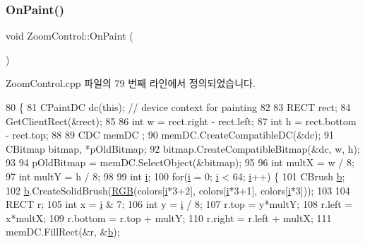 \subsubsection{\texorpdfstring{On\+Paint()}{OnPaint()}}
{\footnotesize\ttfamily void Zoom\+Control\+::\+On\+Paint (\begin{DoxyParamCaption}{ }\end{DoxyParamCaption})\hspace{0.3cm}{\ttfamily [protected]}}



Zoom\+Control.\+cpp 파일의 79 번째 라인에서 정의되었습니다.


\begin{DoxyCode}
80 \{
81   CPaintDC dc(\textcolor{keyword}{this}); \textcolor{comment}{// device context for painting}
82   
83   RECT rect;
84   GetClientRect(&rect);
85 
86   \textcolor{keywordtype}{int} w = rect.right - rect.left;
87   \textcolor{keywordtype}{int} h = rect.bottom - rect.top;
88   
89   CDC memDC ;
90   memDC.CreateCompatibleDC(&dc);
91   CBitmap bitmap, *pOldBitmap;
92   bitmap.CreateCompatibleBitmap(&dc, w, h);
93 
94   pOldBitmap = memDC.SelectObject(&bitmap);
95   
96   \textcolor{keywordtype}{int} multX = w / 8;
97   \textcolor{keywordtype}{int} multY = h / 8;
98 
99   \textcolor{keywordtype}{int} \mbox{\hyperlink{expr-lex_8cpp_acb559820d9ca11295b4500f179ef6392}{i}};
100   \textcolor{keywordflow}{for}(\mbox{\hyperlink{expr-lex_8cpp_acb559820d9ca11295b4500f179ef6392}{i}} = 0; \mbox{\hyperlink{expr-lex_8cpp_acb559820d9ca11295b4500f179ef6392}{i}} < 64; \mbox{\hyperlink{expr-lex_8cpp_acb559820d9ca11295b4500f179ef6392}{i}}++) \{
101     CBrush \mbox{\hyperlink{expr-lex_8cpp_a91b64995742fd30063314f12340b4b5a}{b}};
102     \mbox{\hyperlink{expr-lex_8cpp_a91b64995742fd30063314f12340b4b5a}{b}}.CreateSolidBrush(\mbox{\hyperlink{bilinear_8cpp_a4a118ad3ee36468a3fa616977a64864e}{RGB}}(colors[\mbox{\hyperlink{expr-lex_8cpp_acb559820d9ca11295b4500f179ef6392}{i}}*3+2], colors[\mbox{\hyperlink{expr-lex_8cpp_acb559820d9ca11295b4500f179ef6392}{i}}*3+1], colors[\mbox{\hyperlink{expr-lex_8cpp_acb559820d9ca11295b4500f179ef6392}{i}}*3]));
103 
104     RECT r;
105     \textcolor{keywordtype}{int} x = \mbox{\hyperlink{expr-lex_8cpp_acb559820d9ca11295b4500f179ef6392}{i}} & 7;
106     \textcolor{keywordtype}{int} y = \mbox{\hyperlink{expr-lex_8cpp_acb559820d9ca11295b4500f179ef6392}{i}} / 8;
107     r.top = y*multY;
108     r.left = x*multX;
109     r.bottom = r.top + multY;
110     r.right = r.left + multX;
111     memDC.FillRect(&r, &\mbox{\hyperlink{expr-lex_8cpp_a91b64995742fd30063314f12340b4b5a}{b}});

\end{DoxyCode}
